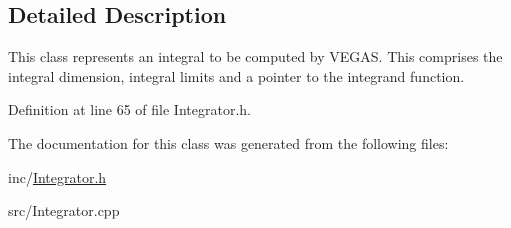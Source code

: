\subsection{Detailed Description}
This class represents an integral to be computed by V\-E\-G\-A\-S. This comprises the integral dimension, integral limits and a pointer to the integrand function. 

Definition at line 65 of file Integrator.\-h.



The documentation for this class was generated from the following files\-:\begin{DoxyCompactItemize}
\item 
inc/\hyperlink{Integrator_8h}{Integrator.\-h}\item 
src/Integrator.\-cpp\end{DoxyCompactItemize}
